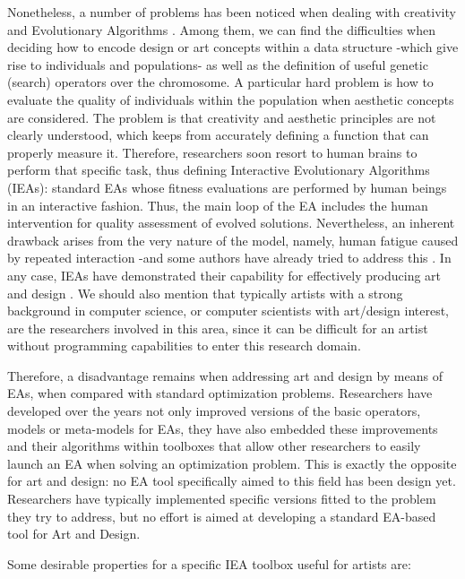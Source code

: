\documentclass{llncs}
\begin{document}
Nonetheless, a number of problems has been noticed when dealing with creativity and Evolutionary Algorithms \cite{DBLP:conf/evoW/McCormack05}.
Among them, we can find the difficulties when deciding how to encode design or art concepts within a data structure
-which give rise to individuals and populations-  as well as the definition of useful genetic (search) operators over the chromosome.
A particular hard problem is how to evaluate the quality of individuals within the population when aesthetic concepts are considered.
The problem is that creativity and aesthetic principles are not clearly understood, which keeps from accurately defining a function that can properly  measure it.  Therefore, researchers soon resort to human brains to perform that specific task, thus defining Interactive Evolutionary Algorithms (IEAs):
standard EAs whose fitness evaluations are performed by human beings in an interactive fashion.
Thus, the main loop of the EA includes the human intervention for quality assessment of evolved solutions.
Nevertheless, an inherent drawback arises from the very nature of the model, namely, human fatigue caused by repeated interaction -and some authors have already tried to address this \cite{Frade:2010:EvoGAMES}.
In any case, IEAs have demonstrated their capability for effectively producing art and design \cite{Bentley:1999:intro,Sims:1991,todd:1992}.
We should also mention that typically artists with a strong background in computer science, or computer scientists with art/design interest,
are the researchers involved in this area, since it can be difficult for an artist without programming capabilities to enter this research domain.

Therefore, a disadvantage remains when addressing art and design by means of EAs, when compared with standard optimization problems.
Researchers have developed over the years not only improved versions of the basic operators, models or meta-models for EAs, they have also embedded these
improvements and their algorithms within toolboxes that allow other researchers to easily launch an EA when solving an optimization problem.
This is exactly the opposite for art and design: no EA tool specifically aimed to this field has been design yet.
Researchers have typically implemented specific versions fitted to the problem they try to address,
but no effort is aimed at developing a standard EA-based tool for Art and Design. %

Some desirable properties for a specific IEA %
toolbox useful for artists are:
\end{document}
